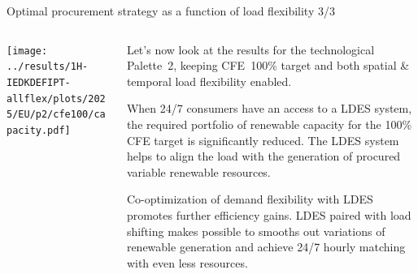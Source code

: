 \begin{frame}{Optimal procurement strategy as a function of load flexibility 3/3}

  {\footnotesize
  \vspace{0.2cm}
  
  \begin{columns}[T]

  \begin{column}{9cm}
  \centering
  \texttt{[image: ../results/1H-IEDKDEFIPT-allflex/plots/2025/EU/p2/cfe100/capacity.pdf]}
  \end{column}

  \begin{column}{6cm}
  \vspace{0.1cm}
  Let's now look at the results for the \alert{technological Palette~2}, keeping CFE~100\% target and both spatial \& temporal load flexibility enabled.
  
  \vspace{0.1cm} 
  When 24/7 consumers have an access to a LDES system, the required portfolio of renewable capacity for the 100\% CFE target is significantly reduced. The LDES system helps to align the load with the generation of procured variable renewable resources. 
  
  \vspace{0.1cm} 
  Co-optimization of demand flexibility with LDES \alert{promotes further efficiency gains}. LDES paired with load shifting makes possible to smooths out variations of renewable generation and achieve 24/7 hourly matching with even less resources.

  \end{column}
  \end{columns}
  }
\end{frame}


